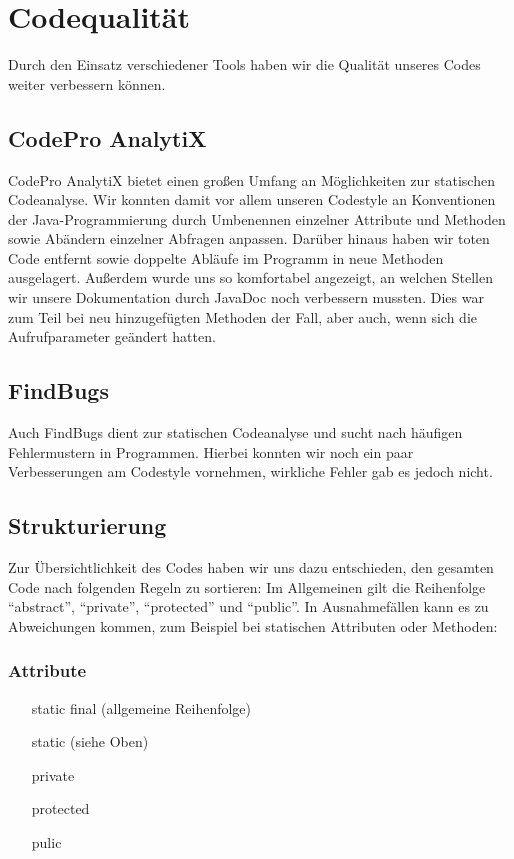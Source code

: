 \documentclass[parskip=full]{scrreprt}
\begin{document}
\chapter{Codequalität}

Durch den Einsatz verschiedener Tools haben wir die Qualität unseres Codes weiter verbessern können.

\section{CodePro AnalytiX}

CodePro AnalytiX bietet einen großen Umfang an Möglichkeiten zur statischen Codeanalyse. Wir konnten damit vor allem unseren Codestyle an Konventionen der Java-Programmierung durch Umbenennen einzelner Attribute und Methoden sowie Abändern einzelner Abfragen anpassen. Darüber hinaus haben wir toten Code entfernt sowie doppelte Abläufe im Programm in neue Methoden ausgelagert.
Außerdem wurde uns so komfortabel angezeigt, an welchen Stellen wir unsere Dokumentation durch JavaDoc noch verbessern mussten. Dies war zum Teil bei neu hinzugefügten Methoden der Fall, aber auch, wenn sich die Aufrufparameter geändert hatten.

\section{FindBugs}

Auch FindBugs dient zur statischen Codeanalyse und sucht nach häufigen Fehlermustern in Programmen. Hierbei konnten wir noch ein paar Verbesserungen am Codestyle vornehmen, wirkliche Fehler gab es jedoch nicht. 

\section{Strukturierung}
Zur Übersichtlichkeit des Codes haben wir uns dazu entschieden, den gesamten Code nach folgenden Regeln zu sortieren: \newline
Im Allgemeinen gilt die Reihenfolge "`abstract"', "`private"', "`protected"' und "`public"'. In Ausnahmefällen kann es zu Abweichungen kommen, zum Beispiel bei statischen Attributen oder Methoden:
\subsection{Attribute}
\begin{enumerate}
	\item[static final] (allgemeine Reihenfolge) 
	\item[static] (siehe Oben)
	\item[private]
	\item[protected]
	\item[pulic]
\end{enumerate}
\end{document}
